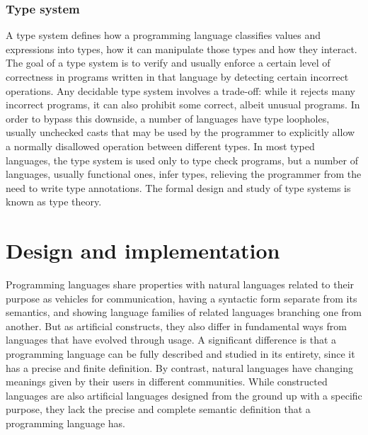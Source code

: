 \subsection{Type system}
A type system defines how a programming language classifies values and
expressions into types, how it can manipulate those types and how they
interact. The goal of a type system is to verify and usually enforce a
certain level of correctness in programs written in that language by
detecting certain incorrect operations. Any decidable type system involves
a trade-off: while it rejects many incorrect programs, it can also prohibit
some correct, albeit unusual programs. In order to bypass this downside, a
number of languages have type loopholes, usually unchecked casts that may
be used by the programmer to explicitly allow a normally disallowed
operation between different types. In most typed languages, the type system
is used only to type check programs, but a number of languages, usually
functional ones, infer types, relieving the programmer from the need to
write type annotations. The formal design and study of type systems is
known as type theory.

\chapter{Design and implementation}
Programming languages share properties with natural languages related to
their purpose as vehicles for communication, having a syntactic form
separate from its semantics, and showing language families of related
languages branching one from another. But as artificial constructs, they
also differ in fundamental ways from languages that have evolved through
usage. A significant difference is that a programming language can be fully
described and studied in its entirety, since it has a precise and finite
definition. By contrast, natural languages have changing meanings given by
their users in different communities. While constructed lan\-guages are also
artificial languages designed from the ground up with a specific purpose,
they lack the precise and complete semantic definition that a programming
language has.

